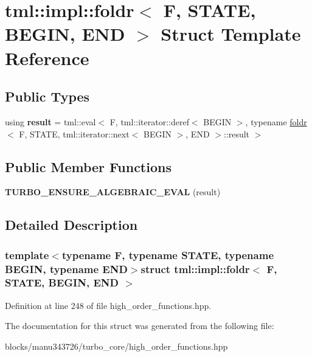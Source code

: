 \hypertarget{structtml_1_1impl_1_1foldr_3_01_f_00_01_s_t_a_t_e_00_01_b_e_g_i_n_00_01_e_n_d_01_4}{\section{tml\+:\+:impl\+:\+:foldr$<$ F, S\+T\+A\+T\+E, B\+E\+G\+I\+N, E\+N\+D $>$ Struct Template Reference}
\label{structtml_1_1impl_1_1foldr_3_01_f_00_01_s_t_a_t_e_00_01_b_e_g_i_n_00_01_e_n_d_01_4}
}
\subsection*{Public Types}
\begin{DoxyCompactItemize}
\item 
\hypertarget{structtml_1_1impl_1_1foldr_3_01_f_00_01_s_t_a_t_e_00_01_b_e_g_i_n_00_01_e_n_d_01_4_ae50706261674f30f859e8869aee8fd41}{using {\bfseries result} = tml\+::eval$<$ F, tml\+::iterator\+::deref$<$ B\+E\+G\+I\+N $>$, typename \hyperlink{structtml_1_1impl_1_1foldr}{foldr}$<$ F, S\+T\+A\+T\+E, tml\+::iterator\+::next$<$ B\+E\+G\+I\+N $>$, E\+N\+D $>$\+::result $>$}\label{structtml_1_1impl_1_1foldr_3_01_f_00_01_s_t_a_t_e_00_01_b_e_g_i_n_00_01_e_n_d_01_4_ae50706261674f30f859e8869aee8fd41}

\end{DoxyCompactItemize}
\subsection*{Public Member Functions}
\begin{DoxyCompactItemize}
\item 
\hypertarget{structtml_1_1impl_1_1foldr_3_01_f_00_01_s_t_a_t_e_00_01_b_e_g_i_n_00_01_e_n_d_01_4_afd203ee941434bbf2ffde54559299cc5}{{\bfseries T\+U\+R\+B\+O\+\_\+\+E\+N\+S\+U\+R\+E\+\_\+\+A\+L\+G\+E\+B\+R\+A\+I\+C\+\_\+\+E\+V\+A\+L} (result)}\label{structtml_1_1impl_1_1foldr_3_01_f_00_01_s_t_a_t_e_00_01_b_e_g_i_n_00_01_e_n_d_01_4_afd203ee941434bbf2ffde54559299cc5}

\end{DoxyCompactItemize}


\subsection{Detailed Description}
\subsubsection*{template$<$typename F, typename S\+T\+A\+T\+E, typename B\+E\+G\+I\+N, typename E\+N\+D$>$struct tml\+::impl\+::foldr$<$ F, S\+T\+A\+T\+E, B\+E\+G\+I\+N, E\+N\+D $>$}



Definition at line 248 of file high\+\_\+order\+\_\+functions.\+hpp.



The documentation for this struct was generated from the following file\+:\begin{DoxyCompactItemize}
\item 
blocks/manu343726/turbo\+\_\+core/high\+\_\+order\+\_\+functions.\+hpp\end{DoxyCompactItemize}
